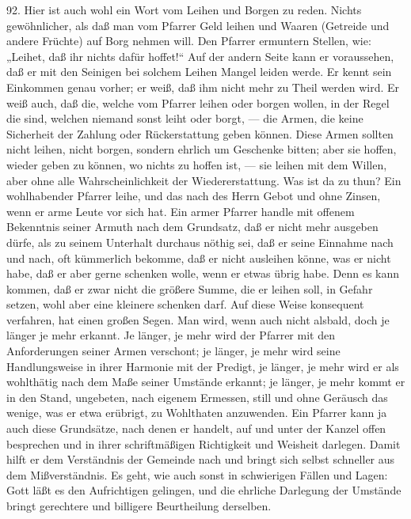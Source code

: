 92. Hier ist auch wohl ein Wort vom Leihen und Borgen zu reden. Nichts gewöhnlicher, als daß man vom Pfarrer Geld leihen und Waaren (Getreide und andere Früchte) auf Borg nehmen will. Den Pfarrer ermuntern Stellen, wie: „Leihet, daß ihr nichts dafür hoffet!“ Auf der andern Seite kann er voraussehen, daß er mit den Seinigen bei solchem Leihen Mangel leiden werde. Er kennt sein Einkommen genau vorher; er weiß, daß ihm
nicht mehr zu Theil werden wird. Er weiß auch, daß die, welche vom Pfarrer leihen oder borgen wollen, in der Regel die sind, welchen niemand sonst leiht oder borgt, — die Armen, die keine Sicherheit der Zahlung oder Rückerstattung geben können. Diese Armen sollten nicht leihen, nicht borgen, sondern ehrlich um Geschenke bitten; aber sie hoffen, wieder geben zu können, wo nichts zu hoffen ist, — sie leihen mit dem Willen, aber ohne alle Wahrscheinlichkeit der Wiedererstattung. Was ist da zu thun? Ein wohlhabender Pfarrer leihe, und das nach des Herrn Gebot und ohne Zinsen, wenn er arme Leute vor sich hat. Ein armer Pfarrer handle mit offenem Bekenntnis seiner Armuth nach dem Grundsatz, daß er nicht mehr ausgeben dürfe, als zu seinem Unterhalt durchaus nöthig sei, daß er seine Einnahme nach und nach, oft kümmerlich bekomme, daß er nicht ausleihen könne, was er nicht habe, daß er aber gerne schenken wolle, wenn er etwas übrig habe. Denn es kann kommen, daß er zwar nicht die größere Summe, die er leihen soll, in Gefahr setzen, wohl aber eine kleinere schenken darf. Auf diese Weise konsequent verfahren, hat einen großen Segen. Man wird, wenn auch nicht alsbald, doch je länger je mehr erkannt. Je länger, je mehr wird der Pfarrer mit den Anforderungen seiner Armen verschont; je länger, je mehr wird seine Handlungsweise in ihrer Harmonie mit der Predigt, je länger, je mehr wird er als wohlthätig nach dem Maße seiner Umstände erkannt; je länger, je mehr kommt er in den Stand, ungebeten, nach eigenem Ermessen, still und ohne Geräusch das wenige, was er etwa erübrigt, zu
Wohlthaten anzuwenden. Ein Pfarrer kann ja auch diese Grundsätze, nach denen er handelt, auf und unter der Kanzel offen besprechen und in ihrer schriftmäßigen Richtigkeit und Weisheit darlegen. Damit hilft er dem Verständnis der Gemeinde nach und bringt sich selbst schneller aus dem Mißverständnis. Es geht, wie auch sonst in schwierigen Fällen und Lagen: Gott läßt es den Aufrichtigen gelingen, und die ehrliche Darlegung der Umstände bringt gerechtere und billigere Beurtheilung derselben.

